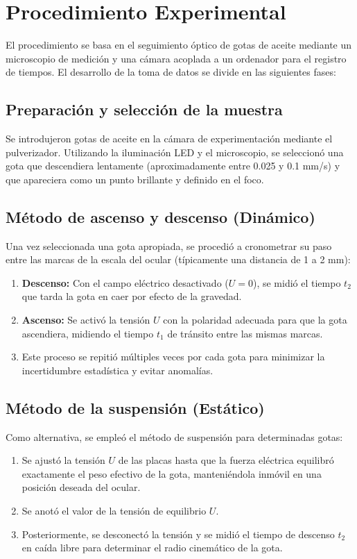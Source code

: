 \documentclass[9pt,a4paper,twocolumn,twoside]{rho-class/rho}
\begin{document}
\section{Procedimiento Experimental}

El procedimiento se basa en el seguimiento óptico de gotas de aceite mediante un microscopio de medición y una cámara acoplada a un ordenador para el registro de tiempos. %
El desarrollo de la toma de datos se divide en las siguientes fases:

\subsection{Preparación y selección de la muestra}
Se introdujeron gotas de aceite en la cámara de experimentación mediante el pulverizador. %
Utilizando la iluminación LED y el microscopio, se seleccionó una gota que descendiera lentamente (aproximadamente entre 0.025 y 0.1 mm/s) y que apareciera como un punto brillante y definido en el foco. %

\subsection{Método de ascenso y descenso (Dinámico)}

Una vez seleccionada una gota apropiada, se procedió a cronometrar su paso entre las marcas de la escala del ocular (típicamente una distancia de 1 a 2 mm): %
\begin{enumerate}
    \item \textbf{Descenso:} Con el campo eléctrico desactivado ($U = 0$), se midió el tiempo $t_2$ que tarda la gota en caer por efecto de la gravedad. %
    \item \textbf{Ascenso:} Se activó la tensión $U$ con la polaridad adecuada para que la gota ascendiera, midiendo el tiempo $t_1$ de tránsito entre las mismas marcas. %
    \item Este proceso se repitió múltiples veces por cada gota para minimizar la incertidumbre estadística y evitar anomalías. %
\end{enumerate}

\subsection{Método de la suspensión (Estático)}

Como alternativa, se empleó el método de suspensión para determinadas gotas: %
\begin{enumerate}
    \item Se ajustó la tensión $U$ de las placas hasta que la fuerza eléctrica equilibró exactamente el peso efectivo de la gota, manteniéndola inmóvil en una posición deseada del ocular. %
    \item Se anotó el valor de la tensión de equilibrio $U$. %
    \item Posteriormente, se desconectó la tensión y se midió el tiempo de descenso $t_2$ en caída libre para determinar el radio cinemático de la gota. %
\end{enumerate}
\end{document}
